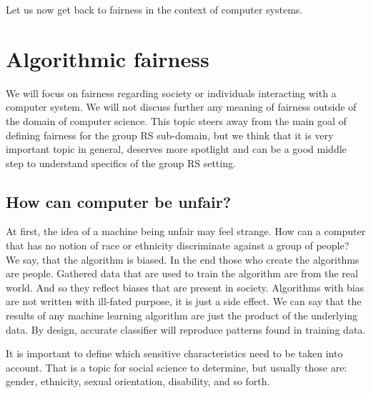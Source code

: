 Let us now get back to fairness in the context of computer systems.









\section{Algorithmic fairness}\label{subsec:02_general.algorithmic_fairness_and_possible_meanings}
We will focus on fairness regarding society or individuals interacting with a computer system. We will not discuss further any meaning of fairness outside of the domain of computer science. This topic steers away from the main goal of defining fairness for the group RS sub-domain, but we think that it is very important topic in general, deserves more spotlight and can be a good middle step to understand specifics of the group RS setting.

\subsection{How can computer be unfair?}
At first, the idea of a machine being unfair may feel strange. How can a computer that has no notion of race or ethnicity discriminate against a group of people? We say, that the algorithm is biased. In the end those who create the algorithms are people. Gathered data that are used to train the algorithm are from the real world. And so they reflect biases that are present in society. Algorithms with bias are not written with ill-fated purpose, it is just a side effect. We can say that the results of any machine learning algorithm are just the product of the underlying data. By design, accurate classifier will reproduce patterns found in training data.

It is important to define which sensitive characteristics need to be taken into account. That is a topic for social science to determine, but usually those are: gender, ethnicity, sexual orientation, disability, and so forth.

